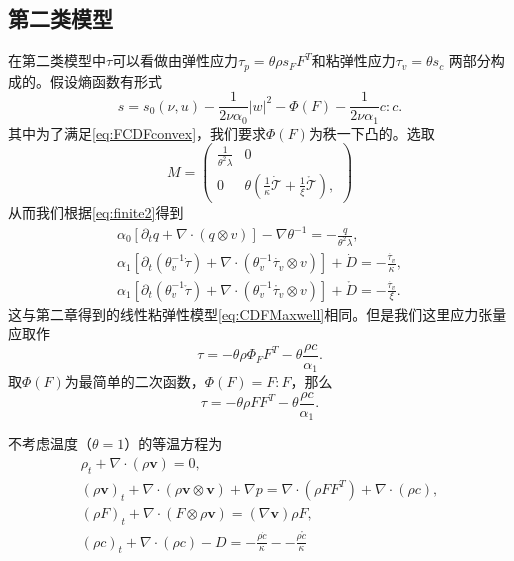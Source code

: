 \documentclass{article}
\begin{document}
\subsection{第二类模型}
在第二类模型中$\tau$可以看做由弹性应力$\tau_p = \theta \rho s_F F^T$和粘弹性应力$\tau_v=\theta s_c$
两部分构成的。假设熵函数有形式
\begin{equation*}
 	s = s_0(\nu,u) - \frac{1}{2 \nu \alpha_0} |w|^2 - \Phi (F)  - \frac{1}{2\nu \alpha_1}c:c .
\end{equation*}
其中为了满足\eqref{eq:FCDFconvex}，我们要求$\Phi(F)$为秩一下凸的。选取
\begin{equation*}
	M = \left( \begin{array}{ccc} 
			\frac{1}{\theta^2 \lambda} & 0 \\
			0 &  \theta(\frac{1}{\kappa} \dot{\mathcal{T}} + \frac{1}{\xi} \mathring{\mathcal{T}})  ,
		\end{array} \right)
\end{equation*}
从而我们根据\eqref{eq:finite2}得到
	\begin{subequations}
		\begin{align*}
			\alpha_0 [\partial_t q +  \nabla \cdot (q \otimes v)] - \nabla \theta^{-1} = -\frac{q}{\theta^2 \lambda}, \\
			\alpha_1[\partial_t (\theta_v^{-1} \dot{\tau}) + \nabla \cdot (\theta_v^{-1} \dot{\tau_v} \otimes v)] + \dot{D} = -\frac{\dot{\tau_v}}{\kappa}, \\
			\alpha_1[\partial_t (\theta_v^{-1} \mathring{\tau}) + \nabla \cdot (\theta_v^{-1} \mathring{\tau_v} \otimes v)] + \mathring{D} = -\frac{\dot{\tau_v}}{\xi}. 
		\end{align*}
	\end{subequations}
这与第二章得到的线性粘弹性模型\eqref{eq:CDFMaxwell}相同。但是我们这里应力张量应取作
\begin{equation*}
	\tau = -\theta \rho \Phi_F F^T - \theta \frac{\rho c}{\alpha_1}.
\end{equation*}
取$\Phi(F)$为最简单的二次函数，$\Phi(F) = F:F$，那么
\begin{equation*}
	\tau = -\theta \rho F F^T - \theta \frac{\rho c}{\alpha_1}.
\end{equation*}

不考虑温度（$\theta=1$）的等温方程为
\begin{subequations}\label{eq:compressibleRelax}
  \begin{align}
  \rho_t + \nabla \cdot (\rho \mathbf{v}) = 0, \\
  (\rho \mathbf{v})_t + \nabla \cdot ( \rho \mathbf{v} \otimes \mathbf{v}) + \nabla p = \nabla \cdot (\rho F F^T) + \nabla \cdot ( \rho c), \\
  (\rho F)_t + \nabla \cdot (F \otimes \rho \mathbf{v}) = (\nabla \mathbf{v}) \rho F, \\
  (\rho c)_t + \nabla \cdot (\rho c) - D  = -\frac{\rho \dot{c}}{\kappa} - -\frac{\rho \mathring{c}}{\kappa}
\end{align}
\end{subequations}







\end{document}
